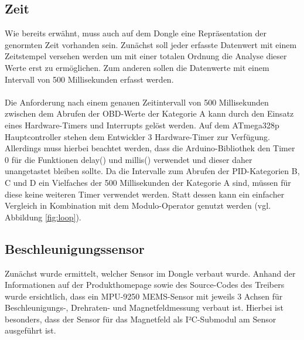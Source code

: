 \subsection{Zeit}
Wie bereits erwähnt, muss auch auf dem Dongle eine Repräsentation der genormten Zeit vorhanden sein. Zunächst soll jeder erfasste Datenwert mit einem Zeitstempel versehen werden um mit einer totalen Ordnung die Analyse dieser Werte erst zu ermöglichen. Zum anderen sollen die Datenwerte mit einem Intervall von 500 Millisekunden erfasst werden.
\paragraph{}
Die Anforderung nach einem genauen Zeitintervall von 500 Millisekunden zwischen dem Abrufen der OBD-Werte der Kategorie A kann durch den Einsatz eines Hardware-Timers und Interrupts gelöst werden.
Auf dem ATmega328p Hauptcontroller stehen dem Entwickler 3 Hardware-Timer zur Verfügung. Allerdings muss hierbei beachtet werden, dass die Arduino-Bibliothek den Timer 0 für die Funktionen delay() und millis() verwendet und dieser daher unangetastet bleiben sollte.\cite{arduinoTimer}
Da die Intervalle zum Abrufen der PID-Kategorien B, C und D ein Vielfaches der 500 Millisekunden der Kategorie A sind, müssen für diese keine weiteren Timer verwendet werden. Statt dessen kann ein einfacher Vergleich in Kombination mit dem Modulo-Operator genutzt werden (vgl. Abbildung \ref{fig:loop}).
\subsection{Beschleunigungssensor}
Zunächst wurde ermittelt, welcher Sensor im Dongle verbaut wurde. Anhand der Informationen auf der Produkthomepage sowie des Source-Codes des Treibers wurde ersichtlich, dass ein MPU-9250 \ac{MEMS}-Sensor mit jeweils 3 Achsen für Beschleunigungs-, Drehraten- und Magnetfeldmessung verbaut ist. Hierbei ist besonders, dass der Sensor für das Magnetfeld als I²C-Submodul am Sensor ausgeführt ist.



